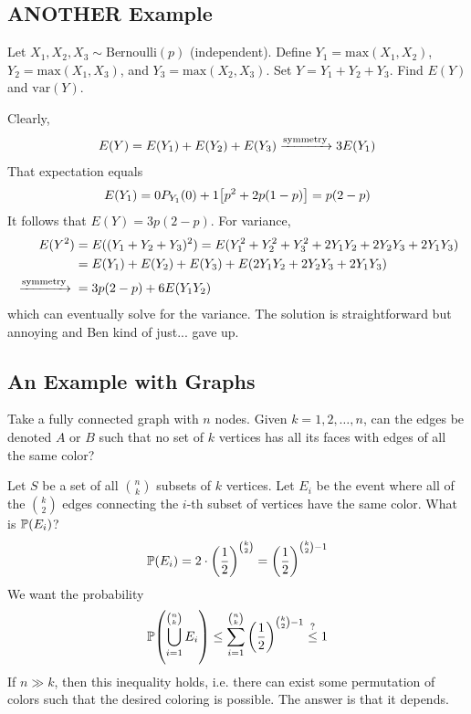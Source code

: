 \subsection{ANOTHER Example}
\begin{proposition}
    Let $X_1, X_2, X_3 \sim \text{Bernoulli}(p)$ (independent). Define $Y_1 = \text{max}(X_1, X_2)$, $Y_2 = \text{max}(X_1, X_3)$, and $Y_3 = \text{max}(X_2, X_3)$. Set $Y = Y_1 + Y_2 + Y_3$. Find $E(Y)$ and $\text{var}(Y)$.
\end{proposition}
\begin{solution}
    Clearly,
    \begin{align}
        E(Y) = E(Y_1) + E(Y_2) + E(Y_3) \ce{->[symmetry]} 3E(Y_1)
    \end{align}
    That expectation equals
    \begin{align}
        E(Y_1) = 0P_{Y_1}(0) + 1\qty[p^2 + 2p(1-p)] = p(2-p)
    \end{align}
    It follows that $E(Y) = 3p(2-p)$. For variance,
    \begin{align}
        E(Y^2) &= E((Y_1 + Y_2 + Y_3)^2) = E(Y_1^2 + Y_2^2 + Y_3^2 + 2Y_1Y_2 + 2Y_2Y_3 + 2Y_1Y_3)\\
        &= E(Y_1) + E(Y_2) + E(Y_3) + E(2Y_1Y_2 + 2Y_2Y_3 + 2Y_1Y_3)\\
        \ce{->[symmetry]} &= 3p(2-p) + 6E(Y_1Y_2)
    \end{align}
    which can eventually solve for the variance. The solution is straightforward but annoying and Ben kind of just... gave up.
\end{solution}


\subsection{An Example with Graphs}
\begin{proposition}
    Take a fully connected graph with $n$ nodes. Given $k = 1, 2, \ldots, n$, can the edges be denoted $A$ or $B$ such that no set of $k$ vertices has all its faces with edges of all the same color?
\end{proposition}
\begin{solution}
    Let $S$ be a set of all $\binom{n}{k}$ subsets of $k$ vertices. Let $E_i$ be the event where all of the $\binom{k}{2}$ edges connecting the $i$-th subset of vertices have the same color. What is $\mathbb{P}(E_i)$?
    \begin{align}
        \mathbb{P}(E_i) = 2 \cdot \qty(\frac{1}{2})^{\binom{k}{2}} = \qty(\frac{1}{2})^{\binom{k}{2} - 1}
    \end{align}
    We want the probability
    \begin{align}
        \mathbb{P}\qty(\bigcup_{i=1}^{\binom{n}{k}} E_i) \le \sum_{i=1}^{\binom{n}{k}} \qty(\frac{1}{2})^{\binom{k}{2} - 1} \stackrel{?}{\le} 1
    \end{align}
    If $n \gg k$, then this inequality holds, i.e. there can exist some permutation of colors such that the desired coloring is possible. The answer is that it depends.
\end{solution}


